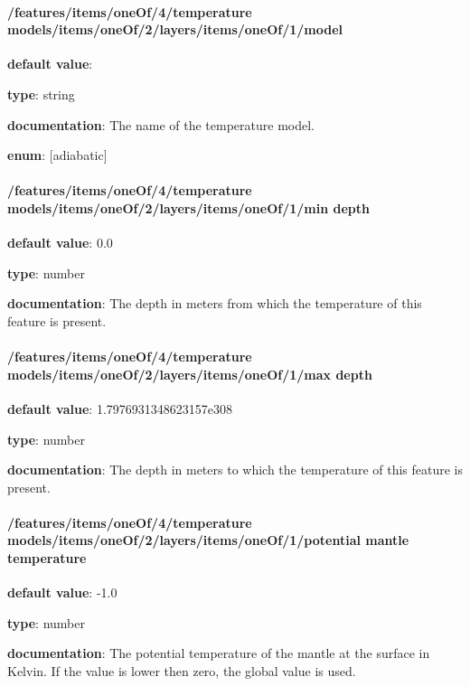 \paragraph{/features/items/oneOf/4/temperature models/items/oneOf/2/layers/items/oneOf/1/model} \begin{itemized}
\item {\bf default value}: 
\item {\bf type}: string
\item {\bf documentation}: The name of the temperature model.
\item {\bf enum}: [adiabatic]\end{itemized}\paragraph{/features/items/oneOf/4/temperature models/items/oneOf/2/layers/items/oneOf/1/min depth} \begin{itemized}
\item {\bf default value}: 0.0
\item {\bf type}: number
\item {\bf documentation}: The depth in meters from which the temperature of this feature is present.
\end{itemized}\paragraph{/features/items/oneOf/4/temperature models/items/oneOf/2/layers/items/oneOf/1/max depth} \begin{itemized}
\item {\bf default value}: 1.7976931348623157e308
\item {\bf type}: number
\item {\bf documentation}: The depth in meters to which the temperature of this feature is present.
\end{itemized}\paragraph{/features/items/oneOf/4/temperature models/items/oneOf/2/layers/items/oneOf/1/potential mantle temperature} \begin{itemized}
\item {\bf default value}: -1.0
\item {\bf type}: number
\item {\bf documentation}: The potential temperature of the mantle at the surface in Kelvin. If the value is lower then zero, the global value is used.

\end{itemized}
